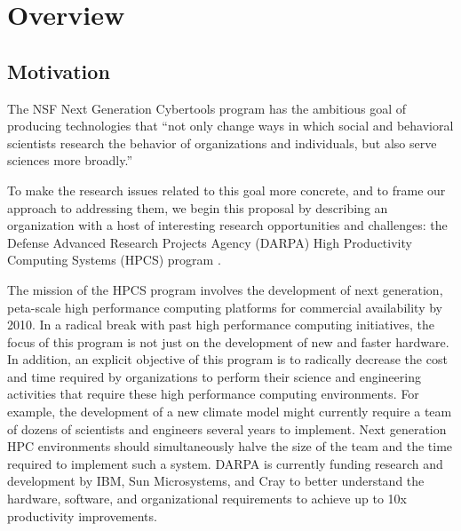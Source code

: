 \nocite{*}

\section{Overview}

\subsection{Motivation}

The NSF Next Generation Cybertools program has the ambitious goal of
producing technologies that ``not only change ways in which social and
behavioral scientists research the behavior of organizations and
individuals, but also serve sciences more broadly.''

To make the research issues related to this goal more concrete, and to frame our
approach to addressing them, we begin this proposal by describing an
organization with a host of interesting research opportunities and
challenges: the Defense Advanced Research Projects Agency (DARPA) High
Productivity Computing Systems (HPCS) program \cite{hpcs}.

The mission of the HPCS program involves the development of next
generation, peta-scale high performance computing platforms for commercial
availability by 2010.  In a radical break with past high performance
computing initiatives, the focus of this program is not just on the
development of new and faster hardware. In addition, an explicit objective
of this program is to radically decrease the cost and time required by
organizations to perform their science and engineering activities that
require these high performance computing environments.  For example, the
development of a new climate model might currently require a team of dozens
of scientists and engineers several years to implement.  Next generation
HPC environments should simultaneously halve the size of the team and the
time required to implement such a system. DARPA is currently funding
research and development by IBM, Sun Microsystems, and Cray to better
understand the hardware, software, and organizational requirements to
achieve up to 10x productivity improvements.  

